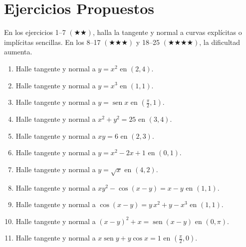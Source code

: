 \documentclass[12pt, letterpaper]{article}
\begin{document}
\newpage
\section{Ejercicios Propuestos}

\noindent En los ejercicios 1--7 $(\bigstar\bigstar)$, halla la tangente y normal a curvas explícitas o implícitas sencillas. En los 8--17 $(\bigstar\bigstar\bigstar)$ y 18--25 $(\bigstar\bigstar\bigstar\bigstar)$, la dificultad aumenta.

\begin{enumerate}[leftmargin=*]

  \item \medio{} Halle tangente y normal a $y = x^2$ en $(2, 4)$.

  \item \medio{} Halle tangente y normal a $y = x^3$ en $(1, 1)$.

  \item \medio{} Halle tangente y normal a $y = \operatorname{sen} x$ en $\left(\frac{\pi}{2}, 1\right)$.

  \item \medio{} Halle tangente y normal a $x^2 + y^2 = 25$ en $(3, 4)$.

  \item \medio{} Halle tangente y normal a $xy = 6$ en $(2, 3)$.

  \item \medio{} Halle tangente y normal a $y = x^2 - 2x + 1$ en $(0, 1)$.

  \item \medio{} Halle tangente y normal a $y = \sqrt{x}$ en $(4, 2)$.

  \item \dificil{} Halle tangente y normal a $xy^2 - \cos(x-y) = x - y$ en $(1,1)$. %

  \item \dificil{} Halle tangente y normal a $\cos(x-y) = y\,x^2 + y - x^3$ en $(1,1)$. %

  \item \dificil{} Halle tangente y normal a $(x-y)^2 + x = \operatorname{sen}(x-y)$ en $(0, \pi)$. %

  \item \dificil{} Halle tangente y normal a $x\operatorname{sen} y + y\cos x = 1$ en $\left(\frac{\pi}{2}, 0\right)$.


\end{enumerate}
\end{document}
